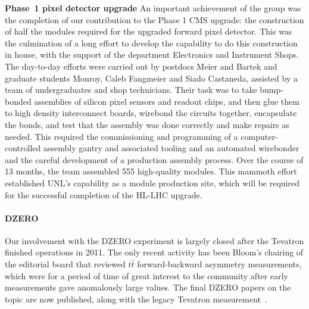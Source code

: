 {\bf Phase~1 pixel detector upgrade}
An important achievement of the group was the completion of our contribution to the Phase 1 CMS upgrade: the construction of half the modules required for the upgraded forward pixel detector.  This was the culmination of a long effort to develop the capability to do this construction in house, with the support of the department Electronics and Instrument Shops.  The day-to-day efforts were carried out by postdocs Meier and Bartek and graduate students Monroy, Caleb Fangmeier and Siado Castaneda, assisted by a team of undergraduates and shop technicians.  Their task was to take bump-bonded assemblies of silicon pixel sensors and readout chips, and then glue them to high density interconnect boards, wirebond the circuits together, encapsulate the bonds, and test that the assembly was done correctly and make repairs as needed.  This required the commissioning and programming of a computer-controlled assembly gantry and associated tooling and an automated wirebonder and the careful development of a production assembly process.  Over the course of 13 months, the team assembled 555 high-quality modules.
This mammoth effort established UNL's capability as a module production site, which will be required for the successful completion of the HL-LHC upgrade.

%

\paragraph{DZERO}
Our involvement with the DZERO experiment is largely closed
after the Tevatron finished operations in 2011.  The only recent activity has been Bloom's chairing of the editorial board that reviewed $t\bar{t}$ forward-backward asymmetry measurements, which were 
for a period of time 
of great interest to the community after early measurements gave anomalously large values.  The final DZERO papers on the topic are now published, along with the legacy Tevatron measurement~\cite{bib:D0afb}.

